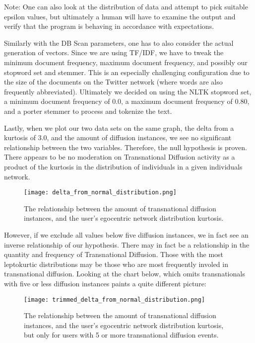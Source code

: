 Note: One can also look at the distribution of data and attempt to
pick suitable epsilon values, but ultimately a human will have to
examine the output and verify that the program is behaving in
accordance with expectations.

Similarly with the DB Scan parameters, one has to also consider the
actual generation of vectors. Since we are using TF/IDF, we have to
tweak the minimum document frequency, maximum document frequency, and
possibly our stopword set and stemmer. This is an especially
challenging configuration due to the size of the documents on the
Twitter network (where words are also frequently
abbreviated). Ultimately we decided on using the NLTK stopword set, a
minimum document frequency of 0.0, a maximum document frequency of
0.80, and a porter stemmer to process and tokenize the text.

Lastly, when we plot our two data sets on the same graph, the delta
from a kurtosis of 3.0, and the amount of diffusion instances, we see
no significant relationship between the two variables. Therefore, the
null hypothesis is proven. There appears to be no moderation on
Transnational Diffusion activity as a product of the kurtosis in the
distribution of individuals in a given individuals network.
\begin{figure}[H]
  \centering
  \texttt{[image: delta\_from\_normal\_distribution.png]}
  \caption{The relationship between the amount of transnational diffusion instances, and the user's egocentric network distribution kurtosis.}
\end{figure}

However, if we exclude all values below five diffusion instances, we
in fact see an inverse relationship of our hypothesis. There may in fact
be a relationship in the quantity and frequency of Transnational
Diffusion. Those with the most leptokurtic distributions may be those
who are most frequently involed in transnational diffusion. Looking at the
chart below, which omits transnationals with five or less diffusion instances
paints a quite different picture:
\begin{figure}[H]
  \centering
  \texttt{[image: trimmed\_delta\_from\_normal\_distribution.png]}
  \caption{The relationship between the amount of transnational diffusion instances, and the user's egocentric network distribution kurtosis, but only for users with 5 or more transnational diffusion events.}
\end{figure}
